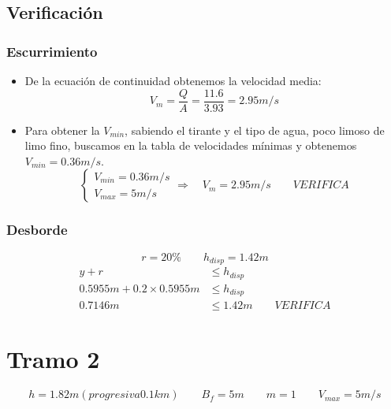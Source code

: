 \documentclass[10.5pt]{article}
\begin{document}
\subsection*{Verificación}

\subsubsection*{Escurrimiento}

\begin{itemize}
 \item De la ecuación de continuidad obtenemos la velocidad media:
    \begin{equation*}
    V_{m} = \dfrac{Q}{A} = \dfrac{11.6}{3.93} = 2.95 m/s
    \end{equation*}
 \item Para obtener la $V_{min}$, sabiendo el tirante y el tipo de agua, poco limoso de limo fino, buscamos en
 la tabla de velocidades mínimas y obtenemos $V_{min} = 0.36 m/s$.
    \begin{equation*}
      \begin{cases}
      V_{min} = 0.36 m/s \\
      V_{max} = 5 m/s
      \end{cases}
      \Longrightarrow \quad
      V_{m} = 2.95 m/s
      \qquad
      VERIFICA
    \end{equation*}
\end{itemize}

\subsubsection*{Desborde}

\begin{equation*}
 r = 20\%
 \qquad
 h_{disp} = 1.42 m
\end{equation*}
\begin{align*}
 y + r &\leq h_{disp} \\
 0.5955 m + 0.2 \times 0.5955 m &\leq h_{disp} \\
 0.7146 m &\leq 1.42 m
 \qquad
 VERIFICA
\end{align*}



\section*{Tramo 2}


\begin{equation*}
  h = 1.82 m (progresiva 0.1 km)
 \qquad
  B_{f} = 5 m
 \qquad
  m = 1
 \qquad
  V_{max} = 5 m/s
\end{equation*}
\end{document}
